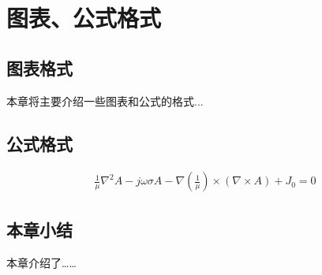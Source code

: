 \cleardoublepage



\section{图表、公式格式}
\subsection{图表格式}
本章将主要介绍一些图表和公式的格式...\\







\subsection{公式格式}


\begin{eqnarray}
\frac{1}{\mu} \nabla^2A - j \omega \sigma A -\nabla(\frac{1}{\mu}) \times(\nabla \times A)+J_0=0
\end{eqnarray}


\subsection{本章小结}
本章介绍了……
